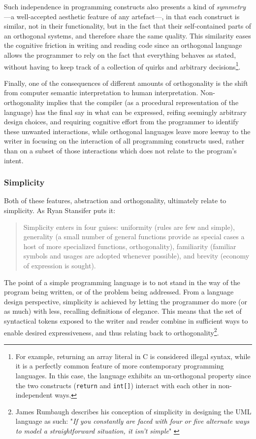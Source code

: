Such independence in programming constructs also presents a kind of \emph{symmetry}—a well-accepted aesthetic feature of any artefact—, in that each construct is similar, not in their functionality, but in the fact that their self-contained parts of an orthogonal systems, and therefore share the same quality. This similarity eases the cognitive friction in writing and reading code since an orthogonal language allows the programmer to rely on the fact that everything behaves as stated, without having to keep track of a collection of quirks and arbitrary decisions\footnote{For example, returning an array literal in C is considered illegal syntax, while it is a perfectly common feature of more contemporary programming languages. In this case, the language exhibits an un-orthogonal property since the two constructs (\lstinline{return} and \lstinline{int[]}) interact with each other in non-independent ways.}.

Finally, one of the consequences of different amounts of orthogonality is the shift from computer semantic interpretation to human interpretation. Non-orthogonality implies that the compiler (as a procedural representation of the language) has the final say in what can be expressed, reifing seemingly arbitrary design choices, and requiring cognitive effort from the programmer to identify these unwanted interactions, while orthogonal languages leave more leeway to the writer in focusing on the interaction of all programming constructs used, rather than on a subset of those interactions which does not relate to the program's intent.

\subsubsection{Simplicity}
\label{subsubsec:programming-simplicity}

Both of these features, abstraction and orthogonality, ultimately relate to simplicity. As Ryan Stansifer puts it:

\begin{quote}
  Simplicity enters in four guises: uniformity (rules are few and simple), generality (a small number of general functions provide as special cases a host of more specialized functions, orthogonality), familiarity (familiar symbols and usages are adopted whenever possible), and brevity (economy of expression is sought). \citep{stansifer_study_1994}
\end{quote}

The point of a simple programming language is to not stand in the way of the program being written, or of the problem being addressed. From a language design perspective, simplicity is achieved by letting the programmer do more (or as much) with less, recalling definitions of elegance. This means that the set of syntactical tokens exposed to the writer and reader combine in sufficient ways to enable desired expressiveness, and thus relating back to orthogonality\footnote{James Rumbaugh describes his conception of simplicity in designing the UML language as such: "\emph{If you constantly are faced with four or five alternate ways to model a straightforward situation, it isn't simple}" \citep{biancuzzi_masterminds_2009}}.

